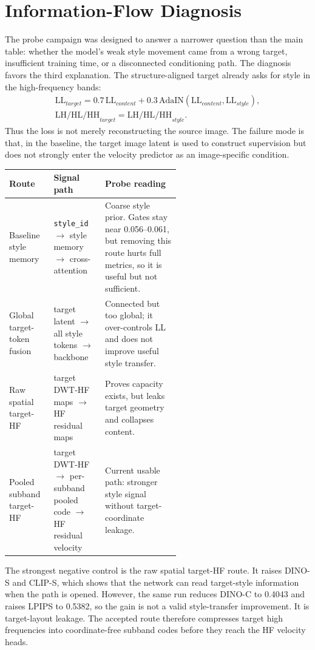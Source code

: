 \documentclass[10pt,twocolumn]{article}
\newcommand{\dinos}{DINO-S}
\newcommand{\dinoc}{DINO-C}
\newcommand{\clips}{CLIP-S}
\begin{document}
\section{Information-Flow Diagnosis}

The probe campaign was designed to answer a narrower question than the main table:
whether the model's weak style movement came from a wrong target, insufficient training
time, or a disconnected conditioning path. The diagnosis favors the third explanation.
The structure-aligned target already asks for style in the high-frequency bands:
\[
  \begin{array}{l}
  \mathrm{LL}_{target}=0.7\,\mathrm{LL}_{content}
  +0.3\,\mathrm{AdaIN}(\mathrm{LL}_{content},\mathrm{LL}_{style}),\\
  \mathrm{LH/HL/HH}_{target}=\mathrm{LH/HL/HH}_{style}.
  \end{array}
\]
Thus the loss is not merely reconstructing the source image. The failure mode is that,
in the baseline, the target image latent is used to construct supervision but does not
strongly enter the velocity predictor as an image-specific condition.

\begin{center}
\footnotesize
\begin{tabularx}{\linewidth}{p{0.26\linewidth}p{0.30\linewidth}X}
\toprule
Route & Signal path & Probe reading \\
\midrule
Baseline style memory & \texttt{style\_id} \(\rightarrow\) style memory \(\rightarrow\) cross-attention & Coarse style prior. Gates stay near 0.056--0.061, but removing this route hurts full metrics, so it is useful but not sufficient. \\
Global target-token fusion & target latent \(\rightarrow\) all style tokens \(\rightarrow\) backbone & Connected but too global; it over-controls LL and does not improve useful style transfer. \\
Raw spatial target-HF & target DWT-HF maps \(\rightarrow\) HF residual maps & Proves capacity exists, but leaks target geometry and collapses content. \\
Pooled subband target-HF & target DWT-HF \(\rightarrow\) per-subband pooled code \(\rightarrow\) HF residual velocity & Current usable path: stronger style signal without target-coordinate leakage. \\
\bottomrule
\end{tabularx}
\normalsize
\end{center}

The strongest negative control is the raw spatial target-HF route. It raises \dinos{}
and \clips{}, which shows that the network can read target-style information when the
path is opened. However, the same run reduces \dinoc{} to 0.4043 and raises LPIPS to
0.5382, so the gain is not a valid style-transfer improvement. It is target-layout
leakage. The accepted route therefore compresses target high frequencies into
coordinate-free subband codes before they reach the HF velocity heads.
\end{document}
